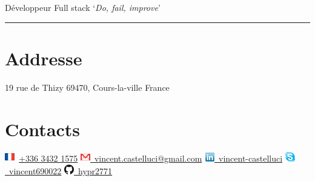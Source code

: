 \documentclass[]{friggeri-cv}
\begin{document}
      {Développeur Full stack}
\hfill \lq\textit{Do, fail, improve}\rq

\rule{397pt}{8pt}

\begin{aside}
  \section{Addresse}
  \hspace{1cm}
    19 rue de Thizy
    69470, Cours-la-ville
    France
  \section{Contacts}
  \hspace{1cm}
    \vspace{0.5mm}\includegraphics[scale=0.60]{img/france.png}~\href{tel:+33634321575}{+336 3432 1575}
    \vspace{0.5mm}\hspace{-2cm}\href{mailto:vincent.castelluci@gmail.com}{\includegraphics[scale=0.60]{img/mail.png}~vincent.castelluci@gmail.com}
    \vspace{0.5mm}\href{https://www.linkedin.com/in/vincent-castelluci-363939170}{\includegraphics[scale=0.60]{img/linkedin.png}~vincent-castelluci}
    \vspace{0.5mm}\href{skype://vincent690022?userinfo}{\includegraphics[scale=0.60]{img/skype.png}~vincent690022}
    \vspace{0.5mm}\href{https://github.com/hypr2771}{\includegraphics[scale=0.60]{img/github.png}~hypr2771}
    ~

\end{aside}
\end{document}
